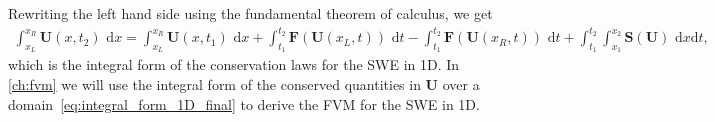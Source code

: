 Rewriting the left hand side using the fundamental theorem of calculus, we get
\begin{align}\label{eq:integral_form_1D_final}
    \int_{x_L}^{x_R} \mathbf{U}(x, t_2) \text{ d}x =
    \int_{x_L}^{x_R}  \mathbf{U}(x, t_1) \text{ d}x + \int_{t_1}^{t_2} \mathbf{F}(\mathbf{U}(x_L, t)) \text{ d}t - \int_{t_1}^{t_2} \mathbf{F}(\mathbf{U}(x_R, t)) \text{ d}t + \int_{t_1}^{t_2} \int_{x_1}^{x_2} \mathbf{S(U)} \text{ d}x \text{d}t,
\end{align}
which is the integral form of the conservation laws for the SWE in 1D.
In \autoref{ch:fvm} we will use the integral form of the conserved quantities in $\mathbf{U}$ over a domain~\eqref{eq:integral_form_1D_final} to derive the FVM for the SWE in 1D.


